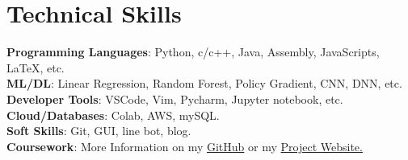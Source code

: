 \documentclass[a4paper,11pt]{article}
\begin{document}
  \section{\textbf{Technical Skills}}
  \begin{itemize}[leftmargin=0.05in, label={}]
    \vspace{1.0mm}
    {\item{
      \textbf{Programming Languages}{: Python, c/c++, Java, Assembly, JavaScripts, LaTeX, etc.} \\
      \textbf{ML/DL}{: Linear Regression, Random Forest, Policy Gradient, CNN, DNN, etc.} \\
      \textbf{Developer Tools}{: VSCode, Vim, Pycharm, Jupyter notebook, etc.} \\
      \textbf{Cloud/Databases}{: Colab, AWS, mySQL.} \\
      \textbf{Soft Skills}{: Git, GUI, line bot, blog.} \\
      \textbf{Coursework}{: More Information on my \href{https://github.com/1chooo}{GitHub} or my \href{https://sites.google.com/g.ncu.edu.tw/1chooo}{Project Website.}} \\
    }}
 \end{itemize}
 \vspace{-16pt}
\end{document}
